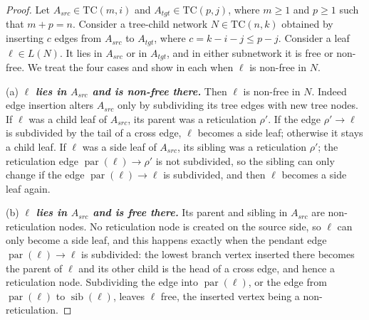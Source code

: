 \documentclass[11pt]{article}
\theoremstyle{definition}
\theoremstyle{remark}
\DeclareMathOperator{\parr}{par}
\DeclareMathOperator{\sib}{sib}
\newcommand{\TC}{\text{TC}}
\begin{document}
\begin{proof}

Let $A_{src}\in \TC(m, i)$ and $A_{tgt}\in \TC(p, j)$, where 
$m\geq 1$ and $p\geq 1$ such that $m+p=n$. Consider a tree-child network 
$N\in \TC(n, k)$  obtained by 
inserting $c$ edges from $A_{src}$ to $A_{tgt}$, where
 $c=k-i-j \leq p-j$. 
Consider a leaf  $\ell\in L(N)$. It lies in $A_{src}$ or in
$A_{tgt}$, and in either subnetwork it is  free or non-free. We treat the four cases and show in each
when $\ell$ is non-free in $N$.

 (a) \emph{\bf $\ell$ lies in $A_{src}$ and is non-free there.} Then $\ell$ is non-free in $N$. Indeed edge insertion alters $A_{src}$ only by subdividing its tree edges with new tree
nodes. If $\ell$ was a child leaf of $A_{src}$, its parent was a reticulation $\rho'$. If the 
edge $\rho'\to\ell$ is subdivided by the tail of a cross edge,   $\ell$
becomes a side leaf; otherwise it stays a child leaf. 
If $\ell$ was a side leaf of $A_{src}$,
its sibling was a reticulation $\rho'$; the reticulation edge $\parr(\ell)\to\rho'$ is not subdivided, so the sibling can only change if the edge $\parr(\ell)\to \ell$ is
subdivided, and then $\ell$ becomes a side leaf again. 


(b) \emph{\bf $\ell$ lies in $A_{src}$ and is free there.} Its parent and sibling in $A_{src}$ are
non-reticulation nodes. No reticulation node is created on the source side, so $\ell$ can only become
a side leaf, and this happens exactly when the pendant edge  $\parr(\ell)\to \ell$ is subdivided: the lowest branch vertex inserted
there becomes the parent of $\ell$ and its other child is the head of a cross edge, and hence a reticulation node.
Subdividing the edge into $\parr(\ell)$, or the edge from $\parr(\ell)$ to $\sib(\ell)$,
leaves $\ell$ free, the inserted vertex being a non-reticulation. 



\end{proof}
\end{document}

